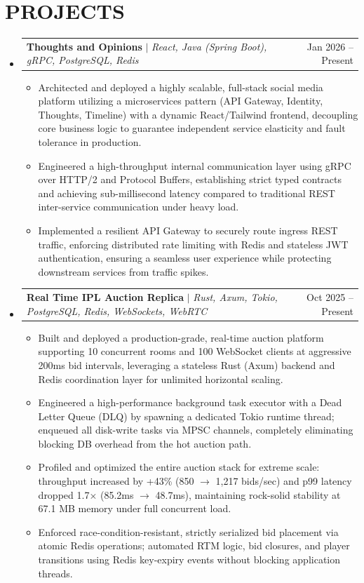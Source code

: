 \documentclass[letterpaper,11pt]{article}
\makeatletter
\newcommand{\resumeItem}[1]{
  \item\small{
    {#1 \vspace{-2pt}}
  }
}
\newcommand{\resumeProjectHeading}[2]{
    \item
    \begin{tabular*}{0.97\textwidth}{l@{\extracolsep{\fill}}r}
      \small#1 & #2 \\
    \end{tabular*}\vspace{-7pt}
}
\newcommand{\resumeSubHeadingListStart}{\begin{itemize}[leftmargin=0.15in, label={}]}
\newcommand{\resumeSubHeadingListEnd}{\end{itemize}}
\newcommand{\resumeItemListStart}{\begin{itemize}}
\newcommand{\resumeItemListEnd}{\end{itemize}\vspace{-5pt}}
\makeatother
\begin{document}
\section{PROJECTS}
    \resumeSubHeadingListStart
      \resumeProjectHeading
          {\textbf{Thoughts and Opinions} $|$ \emph{React, Java (Spring Boot), gRPC, PostgreSQL, Redis}}{Jan 2026 -- Present}
          \resumeItemListStart
            \resumeItem{Architected and deployed a highly scalable, full-stack social media platform utilizing a microservices pattern (API Gateway, Identity, Thoughts, Timeline) with a dynamic React/Tailwind frontend, decoupling core business logic to guarantee independent service elasticity and fault tolerance in production.}
            \resumeItem{Engineered a high-throughput internal communication layer using gRPC over HTTP/2 and Protocol Buffers, establishing strict typed contracts and achieving sub-millisecond latency compared to traditional REST inter-service communication under heavy load.}
            \resumeItem{Implemented a resilient API Gateway to securely route ingress REST traffic, enforcing distributed rate limiting with Redis and stateless JWT authentication, ensuring a seamless user experience while protecting downstream services from traffic spikes.}
          \resumeItemListEnd
          
      \resumeProjectHeading
          {\textbf{Real Time IPL Auction Replica} $|$ \emph{Rust, Axum, Tokio, PostgreSQL, Redis, WebSockets, WebRTC}}{Oct 2025 -- Present}
          \resumeItemListStart
            \resumeItem{Built and deployed a production-grade, real-time auction platform supporting 10 concurrent rooms and 100 WebSocket clients at aggressive 200ms bid intervals, leveraging a stateless Rust (Axum) backend and Redis coordination layer for unlimited horizontal scaling.}
            \resumeItem{Engineered a high-performance background task executor with a Dead Letter Queue (DLQ) by spawning a dedicated Tokio runtime thread; enqueued all disk-write tasks via MPSC channels, completely eliminating blocking DB overhead from the hot auction path.}
            \resumeItem{Profiled and optimized the entire auction stack for extreme scale: throughput increased by +43\% (850 $\rightarrow$ 1,217 bids/sec) and p99 latency dropped 1.7$\times$ (85.2ms $\rightarrow$ 48.7ms), maintaining rock-solid stability at 67.1 MB memory under full concurrent load.}
            \resumeItem{Enforced race-condition-resistant, strictly serialized bid placement via atomic Redis operations; automated RTM logic, bid closures, and player transitions using Redis key-expiry events without blocking application threads.}
          \resumeItemListEnd

    \resumeSubHeadingListEnd
\end{document}
